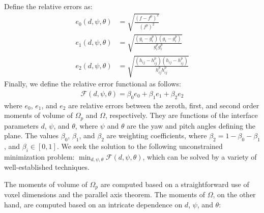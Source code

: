 Define the relative errors as:
\begin{align}
e_0(d,\psi,\theta) &=  \sqrt{\frac{(f - f^p)^2}{(f^p)^2}} \\
e_1(d,\psi,\theta) &=  \sqrt{\frac{(g_i - g_i^p)(g_i - g_i^p)}{g_i^{p}g_i^{p}}} \\
e_2(d,\psi,\theta) &=  \sqrt{\frac{(h_{ij} - h_{ij}^p)(h_{ij} - h_{ij}^p)}{h_{ij}^{p}h_{ij}^{p}}}
\end{align}
Finally, we define the relative error functional as follows:
\begin{align}
\mathcal{F}(d,\psi,\theta) = \beta_0e_0 + \beta_1e_1 + \beta_2e_2
\end{align}
where $e_0$, $e_1$, and $e_2$ are relative errors between the zeroth, first, and second order moments of volume of $\Omega_p$ and $\Omega$, respectively. They are functions of the interface parameters $d$, $\psi$, and $\theta$, where $\psi$ and $\theta$ are the yaw and pitch angles defining the plane. The values $\beta_0$, $\beta_1$, and $\beta_2$ are weighting coefficients, where $\beta_2 = 1 - \beta_0 - \beta_1$, and $\beta_i \in [0, 1]$. We seek the solution to the following unconstrained minimization problem: $\displaystyle \min_{d, \psi, \theta} \mathcal{F}(d,\psi,\theta)$, which can be solved by a variety of well-established techniques.

The moments of volume of $\Omega_p$ are computed based on a straightforward use of voxel dimensions and the parallel axis theorem. The moments of $\Omega$, on the other hand, are computed based on an intricate dependence on $d$, $\psi$, and $\theta$:

